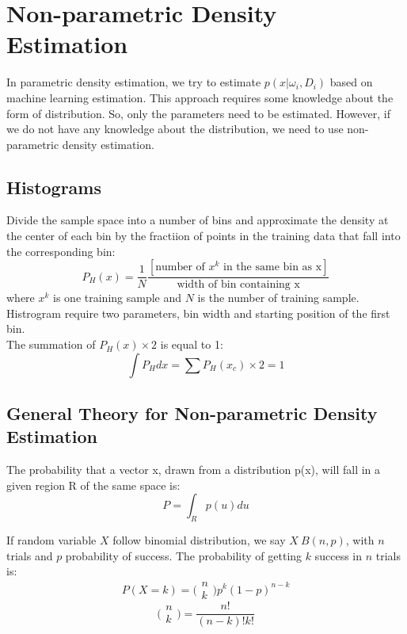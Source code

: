 \chapter{Non-parametric Density Estimation}

\begin{multicols}{2}
\noindent In parametric density estimation, we try to estimate $p(x|\omega_i, D_i)$ based on machine learning estimation. This approach requires some knowledge about the form of distribution. So, only the parameters need to be estimated. However, if we do not have any knowledge about the distribution, we need to use non-parametric density estimation. 

\section{Histograms}

\noindent Divide the sample space into a number of bins and approximate the density at the center of each bin by the fractiion of points in the training data that fall into the corresponding bin:
$$P_H(x) = \frac{1}{N} \frac{[\text{number of } x^k \text{ in the same bin as x}]}{\text{width of bin containing x}}$$
\noindent where $x^k$ is one training sample and $N$ is the number of training sample. \\

\noindent Histrogram require two parameters, bin width and starting position of the first bin. \\

\noindent The summation of $P_H(x) \times 2$ is equal to 1:
$$\int P_H dx = \sum P_H(x_c) \times 2 = 1$$ 
\section{General Theory for Non-parametric Density Estimation}

\noindent The probability that a vector x, drawn from a distribution p(x), will fall in a given region R of the same space is:
$$P=\int_R p(u) du$$

\noindent If random variable $X$ follow binomial distribution, we say $X ~ B(n, p)$, with $n$ trials and $p$ probability of success. The probability of getting $k$ success in $n$ trials is:
$$P(X=k) = \bigg( \begin{matrix} n \\ k \end{matrix}\bigg) p^k (1-p)^{n-k}$$
$$\bigg( \begin{matrix} n \\ k \end{matrix}\bigg) = \frac{n!}{(n-k)!k!}$$


\end{multicols}

